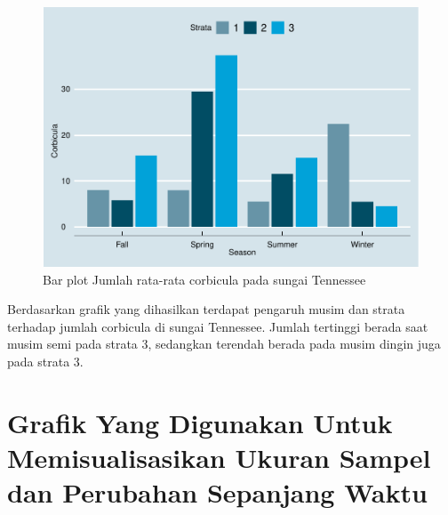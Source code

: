 \documentclass[]{book}
\newenvironment{Shaded}{\begin{snugshade}}{\end{snugshade}}
\newcommand{\KeywordTok}[1]{\textcolor[rgb]{0.13,0.29,0.53}{\textbf{#1}}}
\newcommand{\DataTypeTok}[1]{\textcolor[rgb]{0.13,0.29,0.53}{#1}}
\newcommand{\StringTok}[1]{\textcolor[rgb]{0.31,0.60,0.02}{#1}}
\newcommand{\OperatorTok}[1]{\textcolor[rgb]{0.81,0.36,0.00}{\textbf{#1}}}
\newcommand{\NormalTok}[1]{#1}
\begin{document}
\begin{Shaded}
\end{Shaded}

\begin{figure}

{\centering \includegraphics[width=0.7\linewidth]{EnvStat_files/figure-latex/barteneda-1} 

}

\caption{Bar plot Jumlah rata-rata corbicula pada sungai Tennessee}\label{fig:barteneda}
\end{figure}

Berdasarkan grafik yang dihasilkan terdapat pengaruh musim dan strata
terhadap jumlah corbicula di sungai Tennessee. Jumlah tertinggi berada
saat musim semi pada strata 3, sedangkan terendah berada pada musim
dingin juga pada strata 3.

\section{Grafik Yang Digunakan Untuk Memisualisasikan Ukuran Sampel dan
Perubahan Sepanjang
Waktu}\label{grafik-yang-digunakan-untuk-memisualisasikan-ukuran-sampel-dan-perubahan-sepanjang-waktu}
\end{document}
